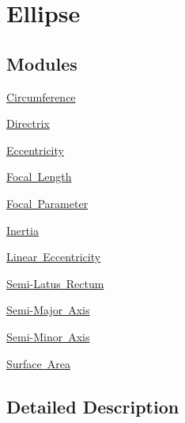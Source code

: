 \hypertarget{group___e_g_x_math-_geometry-2_d-_ellipse}{}\section{Ellipse}
\label{group___e_g_x_math-_geometry-2_d-_ellipse}
\subsection*{Modules}
\begin{DoxyCompactItemize}
\item 
\mbox{\hyperlink{group___e_g_x_math-_geometry-2_d-_ellipse-_circumference}{Circumference}}
\item 
\mbox{\hyperlink{group___e_g_x_math-_geometry-2_d-_ellipse-_directrix}{Directrix}}
\item 
\mbox{\hyperlink{group___e_g_x_math-_geometry-2_d-_ellipse-_eccentricity}{Eccentricity}}
\item 
\mbox{\hyperlink{group___e_g_x_math-_geometry-2_d-_ellipse-_focal_length}{Focal Length}}
\item 
\mbox{\hyperlink{group___e_g_x_math-_geometry-2_d-_ellipse-_focal_parameter}{Focal Parameter}}
\item 
\mbox{\hyperlink{group___e_g_x_math-_geometry-2_d-_ellipse-_inertia}{Inertia}}
\item 
\mbox{\hyperlink{group___e_g_x_math-_geometry-2_d-_ellipse-_linear_eccentricity}{Linear Eccentricity}}
\item 
\mbox{\hyperlink{group___e_g_x_math-_geometry-2_d-_ellipse-_semi_latus_rectum}{Semi-\/\+Latus Rectum}}
\item 
\mbox{\hyperlink{group___e_g_x_math-_geometry-2_d-_ellipse-_semi_major_axis}{Semi-\/\+Major Axis}}
\item 
\mbox{\hyperlink{group___e_g_x_math-_geometry-2_d-_ellipse-_semi_minor_axis}{Semi-\/\+Minor Axis}}
\item 
\mbox{\hyperlink{group___e_g_x_math-_geometry-2_d-_ellipse-_surface_area}{Surface Area}}
\end{DoxyCompactItemize}


\subsection{Detailed Description}
